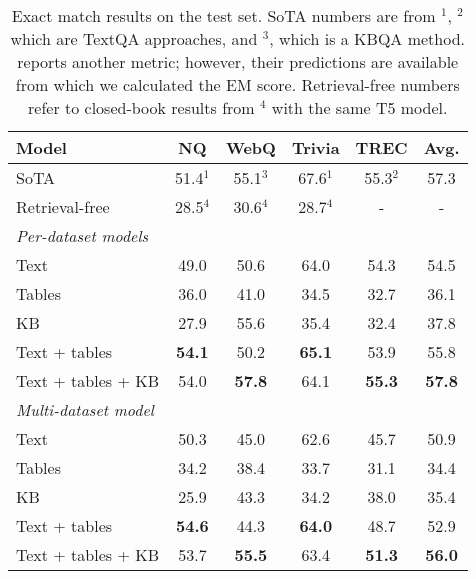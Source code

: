 \documentclass[11pt]{article}
\begin{document}
\begin{table*}[t]
\centering

\begin{tabular}{l@{\hskip 3em}ccccc}
 \toprule
 Model  & \textbf{NQ}  & \textbf{WebQ} & \textbf{Trivia} & \textbf{TREC} & \textbf{Avg.} \\
\midrule
SoTA & 51.4${}^1$ & 55.1${}^3$ & 67.6${}^1$ & 55.3${}^2$ & 57.3 \\
Retrieval-free & 28.5${}^4$ & 30.6${}^4$ & 28.7${}^4$ & - & - \\
\midrule
\multicolumn{1}{l}{\textit{Per-dataset models}} & \multicolumn{4}{l}{} \\
Text & 49.0 & 50.6 & 64.0 & 54.3 & 54.5  \\
Tables & 36.0 & 41.0 & 34.5 & 32.7 & 36.1  \\
KB & 27.9 & 55.6 & 35.4 & 32.4 & 37.8  \\
Text + tables & \textbf{54.1} & 50.2 & \textbf{65.1} & 53.9 & 55.8  \\
Text + tables + KB & 54.0 & \textbf{57.8} & 64.1 & \textbf{55.3} & \textbf{57.8}  \\
\midrule
\multicolumn{1}{l}{\textit{Multi-dataset model}} & \multicolumn{4}{l}{} \\
Text & 50.3 & 45.0 & 62.6 & 45.7 & 50.9  \\
Tables & 34.2 & 38.4 & 33.7 & 31.1 & 34.4  \\
KB & 25.9 & 43.3 & 34.2 & 38.0 & 35.4  \\
Text + tables & \textbf{54.6} & 44.3 & \textbf{64.0} & 48.7 & 52.9  \\
Text + tables + KB & 53.7 & \textbf{55.5} & 63.4 & \textbf{51.3} & \textbf{56.0}  \\
\bottomrule
\end{tabular}
\caption{Exact match results on the test set.  SoTA numbers are from \citep{izacard-grave-2021-leveraging}${}^1$, \citep{iyer-etal-2021-reconsider}${}^2$ which are TextQA approaches,  and \cite{jain-2016-question}${}^3$, which is a KBQA method. \cite{jain-2016-question} reports another metric; however, their predictions are available from which we calculated the EM score. Retrieval-free numbers refer to closed-book results from \citet{t5close}${}^4$ with the same T5 model.}
\label{tab:main}
\vspace{-3mm}
\end{table*}
\end{document}
